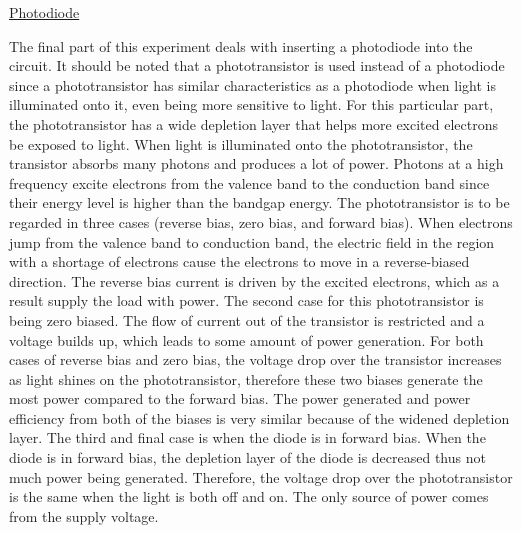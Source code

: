 \underline{Photodiode}

The final part of this experiment deals with inserting a photodiode into the circuit. It should be noted that a phototransistor is used instead of a photodiode since a  phototransistor has similar characteristics as a photodiode when light is illuminated onto it, even being more sensitive to light. For this particular part, the phototransistor has a wide depletion layer that helps more excited electrons be exposed to light. When light is illuminated onto the phototransistor, the transistor absorbs many photons and produces a lot of power. Photons at a high frequency excite electrons from the valence band to the conduction band since their energy level is higher than the bandgap energy. The phototransistor is to be regarded in three cases (reverse bias, zero bias, and forward bias). When electrons jump from the valence band to conduction band, the electric field in the region with a shortage of electrons cause the electrons to move in a reverse-biased direction. The reverse bias current is driven by the excited electrons, which as a result supply the load with power. The second case for this phototransistor is being zero biased. The flow of current out of the transistor is restricted and a voltage builds up, which leads to some amount of power generation. For both cases of reverse bias and zero bias, the voltage drop over the transistor increases as light shines on the phototransistor, therefore these two biases generate the most power compared to the forward bias. The power generated and power efficiency from both of the biases is very similar because of the widened depletion layer. The third and final case is when the diode is in forward bias. When the diode is in forward bias, the depletion layer of the diode is decreased thus not much power being generated. Therefore, the voltage drop over the phototransistor is the same when the light is both off and on. The only source of power comes from the supply voltage. \\



